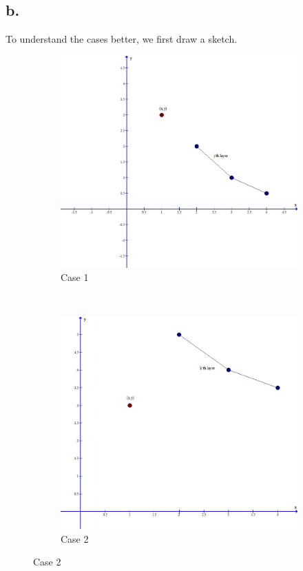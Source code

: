 \documentclass[12pt,a4paper]{report}
\begin{document}
\subsection*{b.}
To understand the cases better, we first draw a sketch.

\begin{figure}[h]
        \centering
        \begin{subfigure}[b]{0.4\textwidth}
                \includegraphics[width=\textwidth]{332graph1}
                \caption{Case 1}
                \label{fig:graph1}
        \end{subfigure}
        ~
        \begin{subfigure}[b]{0.4\textwidth}
                \includegraphics[width=\textwidth]{332graph2}
                \caption{Case 2}
                \label{fig:graph2}
        \end{subfigure}

\end{figure}
\end{document}
